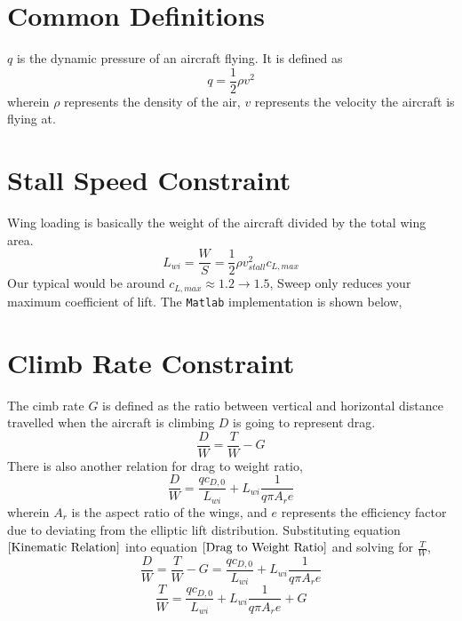\documentclass[letter, 12pt]{article}
\begin{document}
\begin{center}
\section{Common Definitions}
\begin{comment}
\end{comment}
$q$ is the dynamic pressure of an aircraft flying. It is defined as
$$q = \frac{1}{2}\rho v^{2}$$
wherein $\rho$ represents the density of the air, $v$ represents the velocity the aircraft is flying at.


\section{Stall Speed Constraint}
\begin{comment}
\end{comment}
Wing loading is basically the weight of the aircraft divided by the total wing area.
$$L_{wi} = \frac{W}{S} = \frac{1}{2}\rho v_{stall}^{2} c_{L,max}$$
Our typical would be around $c_{L,max} \approx 1.2 \to 1.5$, 
Sweep only reduces your maximum coefficient of lift. The \texttt{Matlab} implementation is shown below,




\section{Climb Rate Constraint}
\begin{comment}
\end{comment}
The cimb rate $G$ is defined as the ratio between vertical and horizontal distance travelled when the aircraft is climbing
$D$ is going to represent drag. 
\begin{equation}\frac{D}{W} = \frac{T}{W } - G \label{Kinematic Relation}\end{equation}
There is also another relation for drag to weight ratio,
\begin{equation}\frac{D}{W } = \frac{qc_{D,0}}{L_{wi}} + L_{wi}\frac{1}{q\pi A_{r}e} \label{Drag to Weight Ratio}\end{equation}
wherein $A_{r}$ is the aspect ratio of the wings, and $e$ represents the efficiency factor due to deviating from the elliptic lift distribution.
Substituting equation $\ref{Kinematic Relation}$ into equation $\ref{Drag to Weight Ratio}$ and solving for $\displaystyle\frac{T}{W }$,
$$\frac{D}{W } = \frac{T}{W } - G  = \frac{qc_{D,0}}{L_{wi}} + L_{wi}\frac{1}{q\pi A_{r}e} $$
$$\frac{T}{W }  = \frac{qc_{D,0}}{L_{wi}} + L_{wi}\frac{1}{q\pi A_{r}e} + G $$


\end{center}
\end{document}
